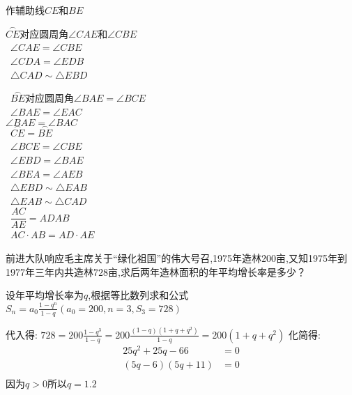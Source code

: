 \begin{questions}
\begin{figure*}[htbp]
\begin{tikzpicture}
		\end{tikzpicture}
	\end{figure*}
	\begin{proofsolution}
		\begin{cenum}
			\item 作辅助线$CE$和$BE$
			\item \because $\overset{\frown}{CE}$对应圆周角$\angle{CAE}$和$\angle{CBE}$
			      \\ \therefore\ $\angle{CAE} = \angle{CBE}$
			      \\ \because\ $\angle{CDA} = \angle{EDB} $
			      \\ \therefore\ $\triangle{CAD} \sim \triangle{EBD}$
			\item \because\ $\overset{\frown}{BE}$对应圆周角$\angle{BAE} = \angle{BCE}$
			      \\ \therefore\ $\angle{BAE} = \angle{EAC}$
			      \\ \because $\angle{BAE} = \angle{BAC}$
			      \\ \therefore\ $\overset{\frown}{CE} = \overset{\frown}{BE}$
			      \\ \therefore\ $\angle{BCE} = \angle{CBE}$
			      \\ \therefore\ $\angle{EBD} = \angle{BAE}$
			      \\ \because\ $\angle{BEA} = \angle{AEB}$
			      \\ \therefore\ $\triangle{EBD} \sim \triangle{EAB}$
			      \\ \therefore\ $\triangle{EAB} \sim \triangle{CAD}$
			      \\ \therefore\ $\dfrac{AC}{AE}={AD}{AB}$
			      \\ \therefore\ $AC\cdot AB = AD\cdot AE$
		\end{cenum}
	\end{proofsolution}
	\question[8]
	前进大队响应毛主席关于\enquote{绿化祖国}的伟大号召,1975年造林$200$亩,又知1975年到1977年三年内共造林$728$亩,求后两年造林面积的年平均增长率是多少？
	\begin{solution}
		设年平均增长率为$q$,根据等比数列求和公式
		\begin{math}
			S_n = a_0\frac{1-q^n}{1-q} (a_0 = 200, n = 3, S_3 = 728)
		\end{math}

		代入得:
		\begin{math}
			728 = 200 \frac{1-q^3}{1-q} = 200 \frac{(1-q)(1 + q + q^2)}{1-q} = 200(1 + q + q^2)
		\end{math}
		化简得:
		\begin{align*}
			25q^2 + 25q - 66  & = 0 \\
			(5q - 6)(5q + 11) & = 0 \\
		\end{align*}
		因为$q > 0$所以$q=1.2$
	\end{solution}


\end{questions}
